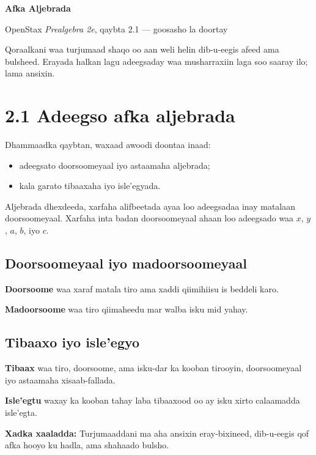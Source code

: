 \documentclass[11pt]{article}
\begin{document}
\begin{center}
  {\Large\bfseries Afka Aljebrada}\par
  \vspace{0.35em}
  {\small OpenStax \textit{Prealgebra 2e}, qaybta 2.1 --- goosasho la doortay}
\end{center}

\vspace{0.6em}
\colorbox{statusblue}{\parbox{0.94\textwidth}{\small
Qoraalkani waa turjumaad shaqo oo aan weli helin dib-u-eegis afeed ama bulsheed.
Erayada halkan lagu adeegsaday waa musharraxiin laga soo saaray ilo; lama ansixin.}}

\section*{2.1 Adeegso afka aljebrada}

Dhammaadka qaybtan, waxaad awoodi doontaa inaad:

\begin{itemize}
  \item adeegsato doorsoomeyaal iyo astaamaha aljebrada;
  \item kala garato tibaaxaha iyo isle'egyada.
\end{itemize}

Aljebrada dhexdeeda, xarfaha alifbeetada ayaa loo adeegsadaa inay matalaan
doorsoomeyaal. Xarfaha inta badan doorsoomeyaal ahaan loo adeegsado waa
$x$, $y$, $a$, $b$, iyo $c$.

\subsection*{Doorsoomeyaal iyo madoorsoomeyaal}

\textbf{Doorsoome} waa xaraf matala tiro ama xaddi qiimihiisu is beddeli karo.

\textbf{Madoorsoome} waa tiro qiimaheedu mar walba isku mid yahay.

\subsection*{Tibaaxo iyo isle'egyo}

\textbf{Tibaax} waa tiro, doorsoome, ama isku-dar ka kooban tirooyin,
doorsoomeyaal iyo astaamaha xisaab-fallada.

\textbf{Isle'egtu} waxay ka kooban tahay laba tibaaxood oo ay isku xirto
calaamadda isle'egta.

\vfill
{\footnotesize\textbf{Xadka xaaladda:} Turjumaaddani ma aha ansixin eray-bixineed,
dib-u-eegis qof afka hooyo ku hadla, ama shahaado bulsho.}
\end{document}
